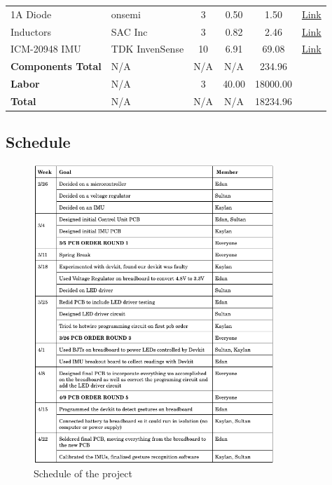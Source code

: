 \begin{table}[htbp]
\begin{tabular}{@{} l l S[table-format=1] S[table-format=2.2] S[table-format=5.2] l @{}}
    1A Diode            & onsemi               & 3                  & 0.50                & 1.50                & \href{https://tinyurl.com/2s4j6yfa}{Link} \\
    Inductors           & SAC Inc & 3          & 0.82               & 2.46                & \href{https://tinyurl.com/j4b4ezpv}{Link} \\
    ICM-20948 IMU       & TDK InvenSense       & 10                 & 6.91                & 69.08               & \href{https://tinyurl.com/m3rkp7xx}{Link} \\
    \addlinespace
    \textbf{Components Total} & {N/A} & {N/A} & {N/A} & 234.96 & \\
    \textbf{Labor}            & {N/A} & {3}    & {40.00} & 18000.00 & \\
    \midrule
    \textbf{Total}            & {N/A} & {N/A}  & {N/A} & 18234.96 & \\
    \bottomrule
    \end{tabular}
    \end{table}
\newpage
\subsection{Schedule}

\begin{figure}[ht]
    \centering
    \includegraphics[width=0.81\textwidth]{images/schedule_new.png}
    \caption{Schedule of the project}
    \label{fig:schedule}
\end{figure}

\newpage